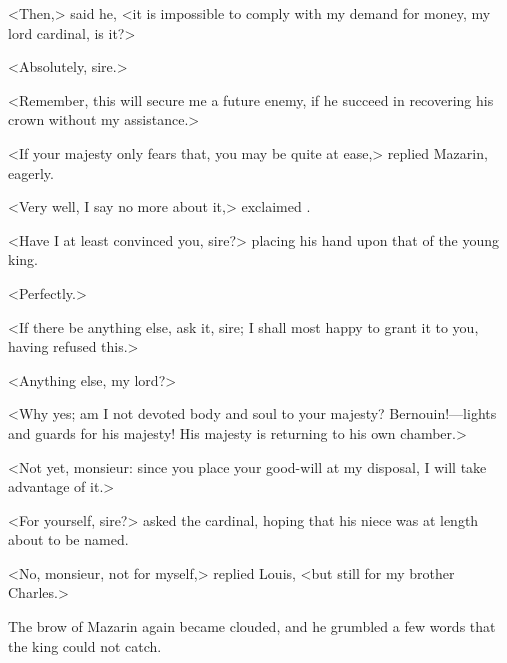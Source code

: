 <Then,> said he, <it is impossible to comply with my demand for money, my lord cardinal, is it?>

<Absolutely, sire.>

<Remember, this will secure me a future enemy, if he succeed in recovering his crown without my assistance.>

<If your majesty only fears that, you may be quite at ease,> replied Mazarin, eagerly.

<Very well, I say no more about it,> exclaimed .

<Have I at least convinced you, sire?> placing his hand upon that of the young king.

<Perfectly.>

<If there be anything else, ask it, sire; I shall most happy to grant it to you, having refused this.>

<Anything else, my lord?>

<Why yes; am I not devoted body and soul to your majesty?  Bernouin!—lights and guards for his majesty! His majesty is returning to his own chamber.>

<Not yet, monsieur: since you place your good-will at my disposal, I will take advantage of it.>

<For yourself, sire?> asked the cardinal, hoping that his niece was at length about to be named.

<No, monsieur, not for myself,> replied Louis, <but still for my brother Charles.>

The brow of Mazarin again became clouded, and he grumbled a few words that the king could not catch. 